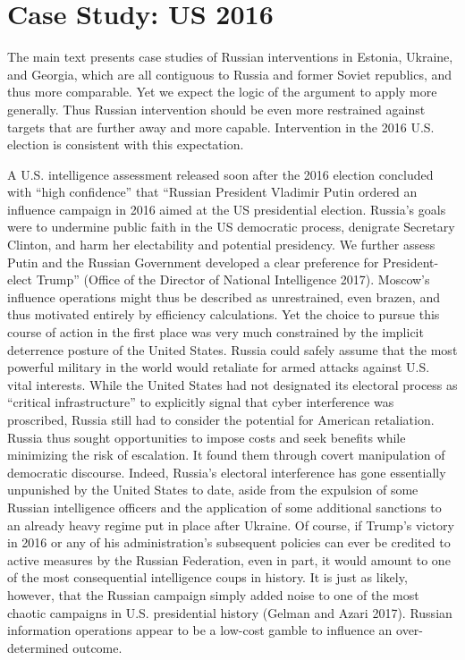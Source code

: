 \documentclass[
]{article}
\begin{document}
\hypertarget{case-study-us-2016}{%
\section{Case Study: US 2016}\label{case-study-us-2016}}

The main text presents case studies of Russian interventions in Estonia, Ukraine, and Georgia, which are all contiguous to Russia and former Soviet republics, and thus more comparable. Yet we expect the logic of the argument to apply more generally. Thus Russian intervention should be even more restrained against targets that are further away and more capable. Intervention in the 2016 U.S. election is consistent with this expectation.

A U.S. intelligence assessment released soon after the 2016 election concluded with ``high confidence'' that ``Russian President Vladimir Putin ordered an influence campaign in 2016 aimed at the US presidential election. Russia's goals were to undermine public faith in the US democratic process, denigrate Secretary Clinton, and harm her electability and potential presidency. We further assess Putin and the Russian Government developed a clear preference for President-elect Trump'' (Office of the Director of National Intelligence 2017). Moscow's influence operations might thus be described as unrestrained, even brazen, and thus motivated entirely by efficiency calculations. Yet the choice to pursue this course of action in the first place was very much constrained by the implicit deterrence posture of the United States. Russia could safely assume that the most powerful military in the world would retaliate for armed attacks against U.S. vital interests. While the United States had not designated its electoral process as ``critical infrastructure'' to explicitly signal that cyber interference was proscribed, Russia still had to consider the potential for American retaliation. Russia thus sought opportunities to impose costs and seek benefits while minimizing the risk of escalation. It found them through covert manipulation of democratic discourse. Indeed, Russia's electoral interference has gone essentially unpunished by the United States to date, aside from the expulsion of some Russian intelligence officers and the application of some additional sanctions to an already heavy regime put in place after Ukraine. Of course, if Trump's victory in 2016 or any of his administration's subsequent policies can ever be credited to active measures by the Russian Federation, even in part, it would amount to one of the most consequential intelligence coups in history. It is just as likely, however, that the Russian campaign simply added noise to one of the most chaotic campaigns in U.S. presidential history (Gelman and Azari 2017). Russian information operations appear to be a low-cost gamble to influence an over-determined outcome.
\end{document}
